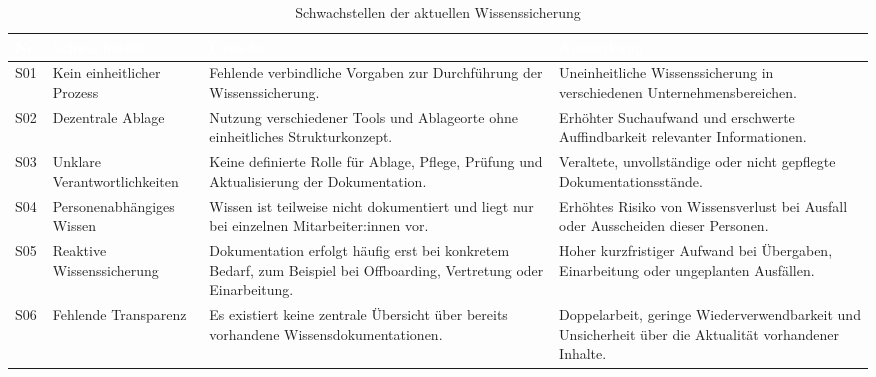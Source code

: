 \documentclass[
  10pt,
  ngerman,
  a4paper,
  toc=graduated,
  numbers=noenddot,
  headings=standardclasses,
  nonumberlist
]{scrartcl}
\begin{document}
\begin{table}[H]
\centering
\begin{tabularx}{\textwidth}{|L{1.2cm}|L{4.0cm}|Y|Y|}
\hline
{}
\textcolor{white}{\textbf{Nr.}} 
& \textcolor{white}{\textbf{Schwachstelle}} 
& \textcolor{white}{\textbf{Ursache}} 
& \textcolor{white}{\textbf{Auswirkung}} \\
\hline

S01 
& Kein einheitlicher Prozess 
& Fehlende verbindliche Vorgaben zur Durchführung der Wissenssicherung. 
& Uneinheitliche Wissenssicherung in verschiedenen Unternehmensbereichen. \\
\hline

S02 
& Dezentrale Ablage 
& Nutzung verschiedener Tools und Ablageorte ohne einheitliches Strukturkonzept. 
& Erhöhter Suchaufwand und erschwerte Auffindbarkeit relevanter Informationen. \\
\hline

S03 
& Unklare Verantwortlichkeiten 
& Keine definierte Rolle für Ablage, Pflege, Prüfung und Aktualisierung der Dokumentation. 
& Veraltete, unvollständige oder nicht gepflegte Dokumentationsstände. \\
\hline

S04 
& Personenabhängiges Wissen 
& Wissen ist teilweise nicht dokumentiert und liegt nur bei einzelnen Mitarbeiter:innen vor.
& Erhöhtes Risiko von Wissensverlust bei Ausfall oder Ausscheiden dieser Personen. \\
\hline

S05 
& Reaktive Wissenssicherung 
& Dokumentation erfolgt häufig erst bei konkretem Bedarf, zum Beispiel bei Offboarding, Vertretung oder Einarbeitung.
& Hoher kurzfristiger Aufwand bei Übergaben, Einarbeitung oder ungeplanten Ausfällen. \\
\hline

S06 
& Fehlende Transparenz 
& Es existiert keine zentrale Übersicht über bereits vorhandene Wissensdokumentationen. 
& Doppelarbeit, geringe Wiederverwendbarkeit und Unsicherheit über die Aktualität vorhandener Inhalte. \\
\hline

\end{tabularx}
\caption{Schwachstellen der aktuellen Wissenssicherung}
\label{tab:schwachstellen_wissenssicherung}
\end{table}
\end{document}
